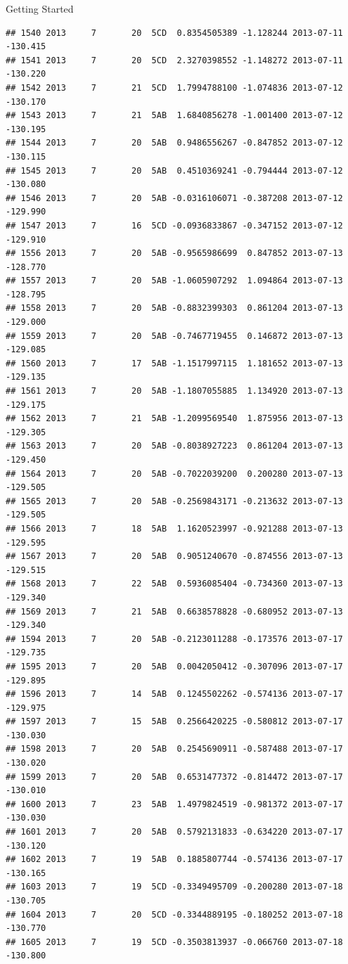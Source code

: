 \documentclass[
  ignorenonframetext,
]{beamer}
\begin{document}
\begin{frame}[fragile]{Getting Started}
\begin{verbatim}
## 1540 2013     7       20  5CD  0.8354505389 -1.128244 2013-07-11 -130.415
## 1541 2013     7       20  5CD  2.3270398552 -1.148272 2013-07-11 -130.220
## 1542 2013     7       21  5CD  1.7994788100 -1.074836 2013-07-12 -130.170
## 1543 2013     7       21  5AB  1.6840856278 -1.001400 2013-07-12 -130.195
## 1544 2013     7       20  5AB  0.9486556267 -0.847852 2013-07-12 -130.115
## 1545 2013     7       20  5AB  0.4510369241 -0.794444 2013-07-12 -130.080
## 1546 2013     7       20  5AB -0.0316106071 -0.387208 2013-07-12 -129.990
## 1547 2013     7       16  5CD -0.0936833867 -0.347152 2013-07-12 -129.910
## 1556 2013     7       20  5AB -0.9565986699  0.847852 2013-07-13 -128.770
## 1557 2013     7       20  5AB -1.0605907292  1.094864 2013-07-13 -128.795
## 1558 2013     7       20  5AB -0.8832399303  0.861204 2013-07-13 -129.000
## 1559 2013     7       20  5AB -0.7467719455  0.146872 2013-07-13 -129.085
## 1560 2013     7       17  5AB -1.1517997115  1.181652 2013-07-13 -129.135
## 1561 2013     7       20  5AB -1.1807055885  1.134920 2013-07-13 -129.175
## 1562 2013     7       21  5AB -1.2099569540  1.875956 2013-07-13 -129.305
## 1563 2013     7       20  5AB -0.8038927223  0.861204 2013-07-13 -129.450
## 1564 2013     7       20  5AB -0.7022039200  0.200280 2013-07-13 -129.505
## 1565 2013     7       20  5AB -0.2569843171 -0.213632 2013-07-13 -129.505
## 1566 2013     7       18  5AB  1.1620523997 -0.921288 2013-07-13 -129.595
## 1567 2013     7       20  5AB  0.9051240670 -0.874556 2013-07-13 -129.515
## 1568 2013     7       22  5AB  0.5936085404 -0.734360 2013-07-13 -129.340
## 1569 2013     7       21  5AB  0.6638578828 -0.680952 2013-07-13 -129.340
## 1594 2013     7       20  5AB -0.2123011288 -0.173576 2013-07-17 -129.735
## 1595 2013     7       20  5AB  0.0042050412 -0.307096 2013-07-17 -129.895
## 1596 2013     7       14  5AB  0.1245502262 -0.574136 2013-07-17 -129.975
## 1597 2013     7       15  5AB  0.2566420225 -0.580812 2013-07-17 -130.030
## 1598 2013     7       20  5AB  0.2545690911 -0.587488 2013-07-17 -130.020
## 1599 2013     7       20  5AB  0.6531477372 -0.814472 2013-07-17 -130.010
## 1600 2013     7       23  5AB  1.4979824519 -0.981372 2013-07-17 -130.030
## 1601 2013     7       20  5AB  0.5792131833 -0.634220 2013-07-17 -130.120
## 1602 2013     7       19  5AB  0.1885807744 -0.574136 2013-07-17 -130.165
## 1603 2013     7       19  5CD -0.3349495709 -0.200280 2013-07-18 -130.705
## 1604 2013     7       20  5CD -0.3344889195 -0.180252 2013-07-18 -130.770
## 1605 2013     7       19  5CD -0.3503813937 -0.066760 2013-07-18 -130.800

\end{verbatim}
\end{frame}
\end{document}
